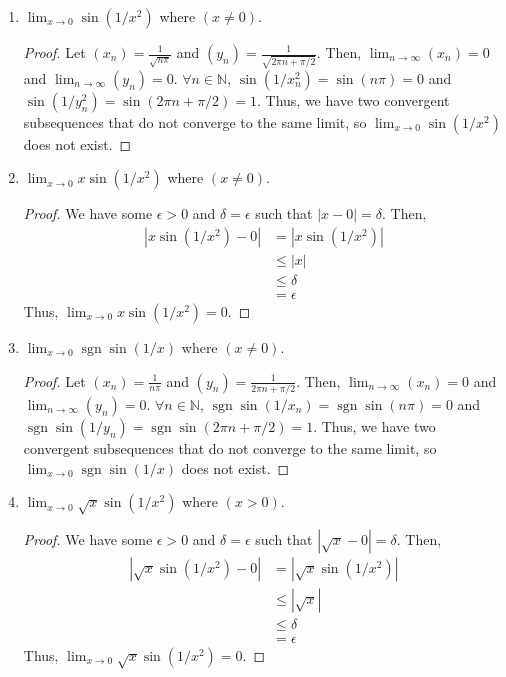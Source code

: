 \documentclass[12pt]{article}
\newcommand\N{\mathbb{N}}
\newcommand{\sgn}{\operatorname{sgn}}
\theoremstyle{remark}
\begin{document}
\begin{enumerate}[label=(\alph*)]
    \item $\lim_{x \to 0} \sin(1/x^2)$ where $(x \neq 0)$.
    \begin{proof}
        Let $(x_n) = \frac{1}{\sqrt{n\pi}}$ and $(y_n) = \frac{1}{\sqrt{2\pi n + \pi/2}}$. Then, $\lim_{n \to \infty} (x_n) = 0$ and $\lim_{n \to \infty} (y_n) = 0$. $\forall n \in \N$, $\sin(1/x_n^2) = \sin(n\pi) = 0$ and $\sin(1/y_n^2) = \sin(2\pi n + \pi/2) = 1$. Thus, we have two convergent subsequences that do not converge to the same limit, so $\lim_{x \to 0} \sin(1/x^2)$ does not exist.
    \end{proof}

    \item $\lim_{x \to 0} x \sin(1/x^2)$ where $(x \neq 0)$.
    \begin{proof}
        We have some $\epsilon > 0$ and $\delta = \epsilon$ such that $|x - 0| = \delta$. Then,
        \begin{align*}
            |x \sin(1/x^2) - 0| &= |x \sin(1/x^2)| \\
            &\leq |x| \\
            &\leq \delta \\
            &= \epsilon
        \end{align*}
        Thus, $\lim_{x \to 0} x \sin(1/x^2) = 0$.
    \end{proof}

    \item $\lim_{x \to 0} \sgn \sin(1/x)$ where $(x \neq 0)$.
    \begin{proof}
        Let $(x_n) = \frac{1}{n\pi}$ and $(y_n) = \frac{1}{2\pi n + \pi/2}$. Then, $\lim_{n \to \infty} (x_n) = 0$ and $\lim_{n \to \infty} (y_n) = 0$. $\forall n \in \N$, $\sgn \sin(1/x_n) = \sgn \sin(n\pi) = 0$ and $\sgn \sin(1/y_n) = \sgn \sin(2\pi n + \pi/2) = 1$. Thus, we have two convergent subsequences that do not converge to the same limit, so $\lim_{x \to 0} \sgn \sin(1/x)$ does not exist.
    \end{proof}

    \item $\lim_{x \to 0} \sqrt{x} \sin(1/x^2)$ where $(x > 0)$.
    \begin{proof}
        We have some $\epsilon > 0$ and $\delta = \epsilon$ such that $|\sqrt{x} - 0| = \delta$. Then,
        \begin{align*}
            |\sqrt{x} \sin(1/x^2) - 0| &= |\sqrt{x} \sin(1/x^2)| \\
            &\leq |\sqrt{x}| \\
            &\leq \delta \\
            &= \epsilon
        \end{align*}
        Thus, $\lim_{x \to 0} \sqrt{x} \sin(1/x^2) = 0$.
    \end{proof}
\end{enumerate}
\end{document}
